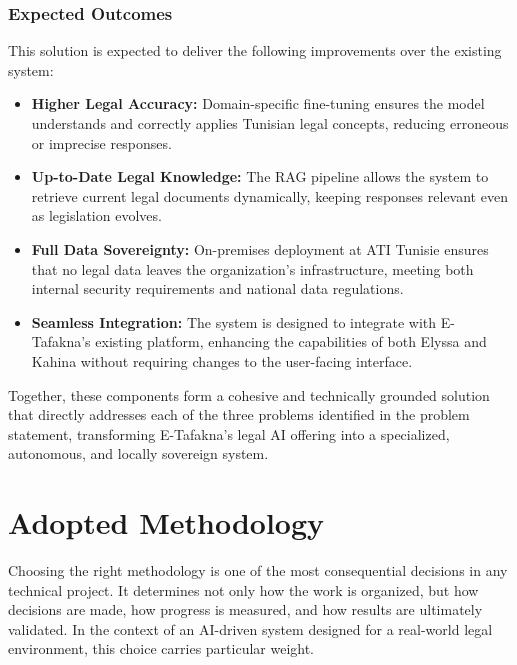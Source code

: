 \subsubsection*{Expected Outcomes}

This solution is expected to deliver the following improvements over the existing system:

\begin{itemize}
    \item \textbf{Higher Legal Accuracy:} Domain-specific fine-tuning ensures the 
    model understands and correctly applies Tunisian legal concepts, reducing 
    erroneous or imprecise responses.

    \item \textbf{Up-to-Date Legal Knowledge:} The \ac{RAG} pipeline allows the 
    system to retrieve current legal documents dynamically, keeping responses 
    relevant even as legislation evolves.

    \item \textbf{Full Data Sovereignty:} On-premises deployment at \ac{ATI} Tunisie 
    ensures that no legal data leaves the organization's infrastructure, meeting 
    both internal security requirements and national data regulations.

    \item \textbf{Seamless Integration:} The system is designed to integrate with 
    E-Tafakna's existing platform, enhancing the capabilities of both Elyssa and 
    Kahina without requiring changes to the user-facing interface.
\end{itemize}

Together, these components form a cohesive and technically grounded solution that 
directly addresses each of the three problems identified in the problem statement, 
transforming E-Tafakna's legal \ac{AI} offering into a specialized, autonomous, 
and locally sovereign system.

\section{Adopted Methodology}
\label{sec:methodology}

Choosing the right methodology is one of the most consequential decisions in any 
technical project. It determines not only how the work is organized, but how 
decisions are made, how progress is measured, and how results are ultimately 
validated. In the context of an \ac{AI}-driven system designed for a real-world 
legal environment, this choice carries particular weight.

